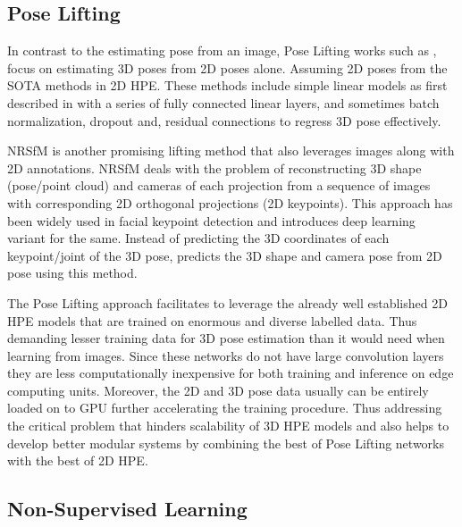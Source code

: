 \subsection{Pose Lifting}

In contrast to the estimating pose from an image, Pose Lifting works such as \cite{poselifter,  amazon1, repnet, c3dpo, unsupervisedAdversarial}, focus on estimating 3D poses from 2D poses alone. Assuming 2D poses from the \ac{SOTA} methods in 2D \ac{HPE}. These methods include simple linear models as first described in \cite{MartinezHRL17} with a series of fully connected linear layers, and sometimes batch normalization, dropout and, residual connections to regress 3D pose effectively.

\ac{NRSfM} is another promising lifting method that also leverages images along with 2D annotations. \ac{NRSfM} deals with the problem of reconstructing 3D shape (pose/point cloud) and cameras of each projection from a sequence of images with corresponding 2D orthogonal projections (2D keypoints). This approach has been widely used in facial keypoint detection and \cite{deepNRSFM} introduces deep learning variant for the same. Instead of predicting the 3D coordinates of each keypoint/joint of the 3D pose, \cite{DistillNRSfM, c3dpo, deepNRSFM, nrsfm++} predicts the 3D shape and camera pose from 2D pose using this method.

The Pose Lifting approach facilitates to leverage the already well established 2D \ac{HPE} models that are trained on enormous and diverse labelled data. Thus demanding lesser training data for 3D pose estimation than it would need when learning from images. Since these networks do not have large convolution layers they are less computationally inexpensive for both training and inference on edge computing units. Moreover, the 2D and 3D pose data usually can be entirely loaded on to GPU further accelerating the training procedure. Thus addressing the critical problem that hinders scalability of 3D \ac{HPE} models and also helps to develop better modular systems by combining the best of Pose Lifting networks with the best of 2D \ac{HPE}.

\subsection{Non-Supervised Learning}

